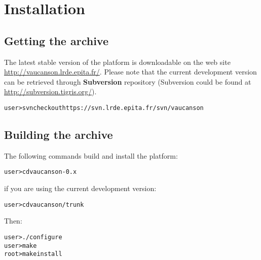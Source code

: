 \chapter{Installation}

\section{Getting the archive}

The latest stable version of the \Vauc platform is downloadable on the
web site \url{http://vaucanson.lrde.epita.fr/}. Please note that the
current development version can be retrieved through
\textbf{Subversion} repository (Subversion could be found at
\url{http://subversion.tigris.org/}).

\begin{alltt}
user> svn checkout https://svn.lrde.epita.fr/svn/vaucanson
\end{alltt}

\section{Building the archive}

The following commands build and install the platform:
\begin{alltt}
user> cd vaucanson-0.x
\end{alltt}
if you are using the current development version:
\begin{alltt}
user> cd vaucanson/trunk
\end{alltt}
Then:
\begin{alltt}
user> ./configure
user> make
root> make install
\end{alltt}
